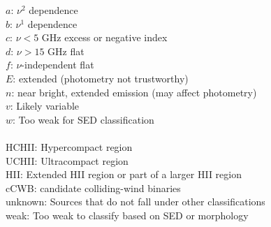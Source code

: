 \begin{table*}[htp]
$a$: $\nu^2$ dependence \\
$b$: $\nu^1$ dependence \\
$c$: $\nu<5$ GHz excess or negative index \\
$d$: $\nu>15$ GHz flat \\
$f$: $\nu$-independent flat \\
$E$: extended (photometry not trustworthy) \\
$n$: near bright, extended emission (may affect photometry) \\
$v$: Likely variable \\
$w$: Too weak for SED classification \\

 \\
HCHII: Hypercompact \hii region \\
UCHII: Ultracompact \hii region \\
HII: Extended HII region or part of a larger HII region \\
cCWB: candidate colliding-wind binaries \\
unknown: Sources that do not fall under other classifications \\
weak: Too weak to classify based on SED or morphology \\

\end{table*}
